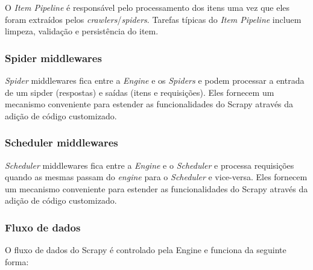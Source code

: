 O \textit{Item Pipeline} é responsável pelo processamento dos itens uma vez que eles foram extraídos pelos \textit{crawlers}/\textit{spiders}. Tarefas típicas do \textit{Item Pipeline} incluem limpeza, validação e persistência do item.

\subsubsection{Spider middlewares}

\emph{Spider} \glspl{middleware} fica entre a \emph{Engine} e os \emph{Spiders} e podem processar a entrada de um sipder (respostas) e saídas (itens e requisições). Eles fornecem um mecanismo conveniente para estender as funcionalidades do Scrapy através da adição de código customizado.

\subsubsection{Scheduler middlewares}

\emph{Scheduler} \glspl{middleware} fica entre a \emph{Engine} e o \emph{Scheduler} e processa requisições quando as mesmas passam do \textit{engine} para o \textit{Scheduler} e vice-versa. Eles fornecem um mecanismo conveniente para estender as funcionalidades do Scrapy através da adição de código customizado.

\subsubsection{Fluxo de dados}

O fluxo de dados do Scrapy é controlado pela Engine e funciona da seguinte forma:

